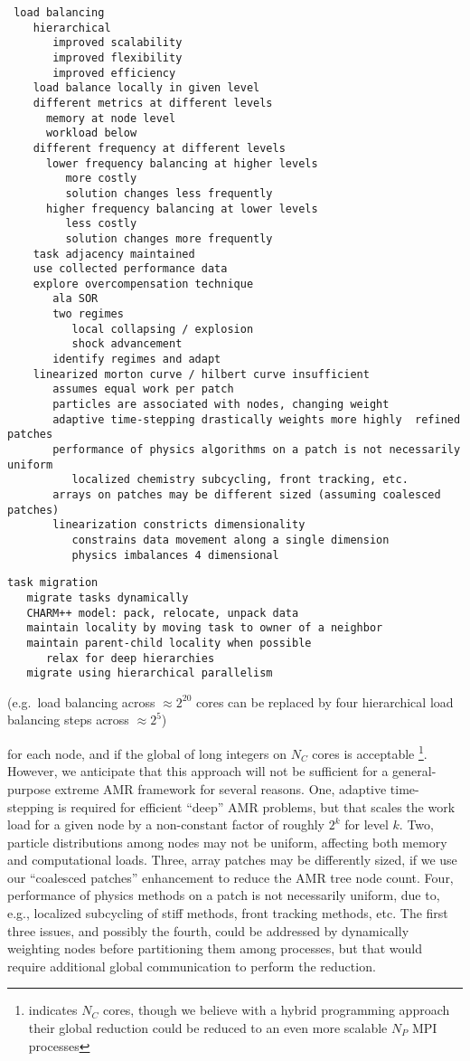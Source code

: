 \documentclass[14pt,letter]{article}
\begin{document}
\begin{verbatim}
 load balancing
    hierarchical
       improved scalability
       improved flexibility
       improved efficiency
    load balance locally in given level
    different metrics at different levels
      memory at node level
      workload below
    different frequency at different levels
      lower frequency balancing at higher levels
         more costly
         solution changes less frequently
      higher frequency balancing at lower levels
         less costly
         solution changes more frequently
    task adjacency maintained
    use collected performance data
    explore overcompensation technique
       ala SOR
       two regimes
          local collapsing / explosion
          shock advancement
       identify regimes and adapt
    linearized morton curve / hilbert curve insufficient
       assumes equal work per patch
       particles are associated with nodes, changing weight
       adaptive time-stepping drastically weights more highly  refined patches
       performance of physics algorithms on a patch is not necessarily uniform
          localized chemistry subcycling, front tracking, etc.
       arrays on patches may be different sized (assuming coalesced patches)
       linearization constricts dimensionality
          constrains data movement along a single dimension
          physics imbalances 4 dimensional
\end{verbatim}

\begin{verbatim}
task migration
   migrate tasks dynamically
   CHARM++ model: pack, relocate, unpack data
   maintain locality by moving task to owner of a neighbor
   maintain parent-child locality when possible
      relax for deep hierarchies
   migrate using hierarchical parallelism
\end{verbatim}

(e.g.~load balancing
across $\approx 2^20$ cores can be replaced by four hierarchical
load balancing steps across $\approx 2^5$)


for each node, and if the global  of long
integers on $N_C$ cores is acceptable \footnote{\cite{BuGh08}
  indicates $N_C$ cores, though we believe with a hybrid programming
  approach their global reduction could be reduced to an even more
  scalable $N_P$ MPI processes}.  However, we anticipate that this
approach will not be sufficient for a general-purpose extreme AMR
framework for several reasons.
%
One, adaptive time-stepping is required for efficient ``deep'' AMR
problems, but that scales the work load for a given node by a
non-constant factor of roughly $2^k$ for level $k$.
%
Two, particle distributions among nodes may not be uniform, affecting both memory and computational loads.
%
Three, array patches may be differently sized, if we use our ``coalesced patches'' enhancement to reduce the AMR tree node count.  
%
Four, performance of physics methods on a patch is not necessarily
uniform, due to, e.g., localized subcycling of stiff methods, front
tracking methods, etc.  The first three issues, and possibly the
fourth, could be addressed by dynamically weighting nodes before
partitioning them among processes, but that would require additional
global communication to perform the reduction.
%
\end{document}
